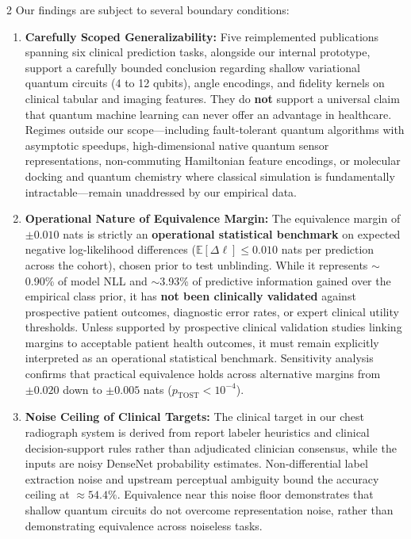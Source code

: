 \documentclass[10pt,a4paper,twoside]{article}
\begin{document}
\begin{multicols}{2}
Our findings are subject to several boundary conditions:
\begin{enumerate}
  \setlength{\itemsep}{1pt}
  \setlength{\parskip}{0pt}
  \item \textbf{Carefully Scoped Generalizability:} Five reimplemented publications spanning six clinical prediction tasks, alongside our internal prototype, support a carefully bounded conclusion regarding shallow variational quantum circuits (4 to 12 qubits), angle encodings, and fidelity kernels on clinical tabular and imaging features. They do \textbf{not} support a universal claim that quantum machine learning can never offer an advantage in healthcare. Regimes outside our scope---including fault-tolerant quantum algorithms with asymptotic speedups, high-dimensional native quantum sensor representations, non-commuting Hamiltonian feature encodings, or molecular docking and quantum chemistry where classical simulation is fundamentally intractable---remain unaddressed by our empirical data.
  \item \textbf{Operational Nature of Equivalence Margin:} The equivalence margin of $\pm 0.010$ nats is strictly an \textbf{operational statistical benchmark} on expected negative log-likelihood differences ($\mathbb{E}[\Delta\ell] \le 0.010$ nats per prediction across the cohort), chosen prior to test unblinding. While it represents $\sim$0.90\% of model NLL and $\sim$3.93\% of predictive information gained over the empirical class prior, it has \textbf{not been clinically validated} against prospective patient outcomes, diagnostic error rates, or expert clinical utility thresholds. Unless supported by prospective clinical validation studies linking margins to acceptable patient health outcomes, it must remain explicitly interpreted as an operational statistical benchmark. Sensitivity analysis confirms that practical equivalence holds across alternative margins from $\pm 0.020$ down to $\pm 0.005$ nats ($p_{\text{TOST}} < 10^{-4}$).
  \item \textbf{Noise Ceiling of Clinical Targets:} The clinical target in our chest radiograph system is derived from report labeler heuristics and clinical decision-support rules rather than adjudicated clinician consensus, while the inputs are noisy DenseNet probability estimates. Non-differential label extraction noise and upstream perceptual ambiguity bound the accuracy ceiling at $\approx 54.4\%$. Equivalence near this noise floor demonstrates that shallow quantum circuits do not overcome representation noise, rather than demonstrating equivalence across noiseless tasks.

\end{enumerate}
\end{multicols}
\end{document}
